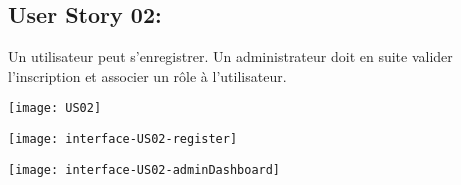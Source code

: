 \newpage{}
\subsection{User Story 02:}
Un utilisateur peut s'enregistrer. Un administrateur doit en suite valider l'inscription et associer un rôle à l'utilisateur.

  \begin{center}
        \texttt{[image: US02]}
  \end{center}


  \begin{center}
        \texttt{[image: interface-US02-register]}
  \end{center}


  \begin{center}
        \texttt{[image: interface-US02-adminDashboard]}
  \end{center}